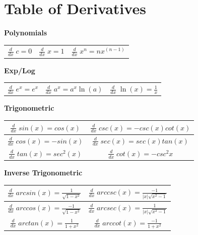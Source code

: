 \documentclass[12pt]{report}
\begin{document}
\section{Table of Derivatives}
\begin{center}
\begin{large}

\textbf{Polynomials}
\def\arraystretch{1.5}
\begin{tabular}{ c | c | c }
	$ \frac{d}{dx} \; c = 0 $ &
	$ \frac{d}{dx} \; x = 1 $ &
	$ \frac{d}{dx} \; x^n = nx^{(n-1)} $ \\
\end{tabular}

\bigskip
\bigskip

\textbf{Exp/Log}
\begin{tabular}{ c | c | c }
	$ \frac{d}{dx} \; e^x = e^x $ &
	$ \frac{d}{dx} \; a^x = a^x \ln(a) $ &
	$ \frac{d}{dx} \; \ln(x) = \frac{1}{x} $ \\
\end{tabular}

\bigskip
\bigskip

\textbf{Trigonometric}
\bigskip
\def\arraystretch{1.5}
\begin{tabular}{ c | c }
	$ \frac{d}{dx} \; sin(x) = cos(x) $ &
	$ \frac{d}{dx} \; csc(x) = -csc(x)cot(x) $ \\

	\hline	
	
	$ \frac{d}{dx} \; cos(x) = -sin(x) $ &
	$ \frac{d}{dx} \; sec(x) = sec(x)tan(x) $ \\
	
	\hline
	
	$ \frac{d}{dx} \; tan(x) = sec^2(x) $ &
	$ \frac{d}{dx} \; cot(x) = -csc^2x $ \\
	

\end{tabular}

\bigskip
\bigskip

\textbf{Inverse Trigonometric}
\bigskip
\def\arraystretch{1.5}
\begin{tabular}{ c | c  }
	$ \frac{d}{dx} \; arcsin(x) = \frac{1}{\sqrt{1-x^2}} $ &
	$ \frac{d}{dx} \; arccsc(x) = \frac{-1}{|x|\sqrt{x^2-1}} $ \\

	\hline	
	
	$ \frac{d}{dx} \; arccos(x) = \frac{-1}{\sqrt{1-x^2}} $ &
	$ \frac{d}{dx} \; arcsec(x) = \frac{1}{|x|\sqrt{x^2-1}} $ \\
	
	\hline
	
	$ \frac{d}{dx} \; arctan(x) = \frac{1}{1+x^2} $ &
	$ \frac{d}{dx} \; arccot(x) = \frac{-1}{1+x^2} $ \\
	

\end{tabular}

\end{large}
\end{center}
\end{document}
